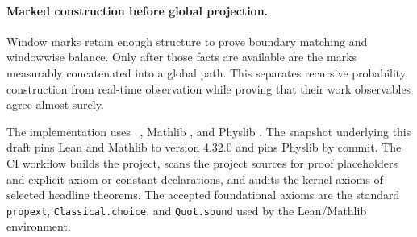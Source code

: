 \paragraph{Marked construction before global projection.}
Window marks retain enough structure to prove boundary matching and windowwise balance. Only after those facts are available are the marks measurably concatenated into a global path. This separates recursive probability construction from real-time observation while proving that their work observables agree almost surely.

The implementation uses \Lean\ \parencite{Moura2021}, Mathlib \parencite{Mathlib2020}, and Physlib \parencite{Physlib}. The snapshot underlying this draft pins Lean and Mathlib to version 4.32.0 and pins Physlib by commit. The CI workflow builds the project, scans the project sources for proof placeholders and explicit axiom or constant declarations, and audits the kernel axioms of selected headline theorems. The accepted foundational axioms are the standard \texttt{propext}, \texttt{Classical.choice}, and \texttt{Quot.sound} used by the Lean/Mathlib environment.
